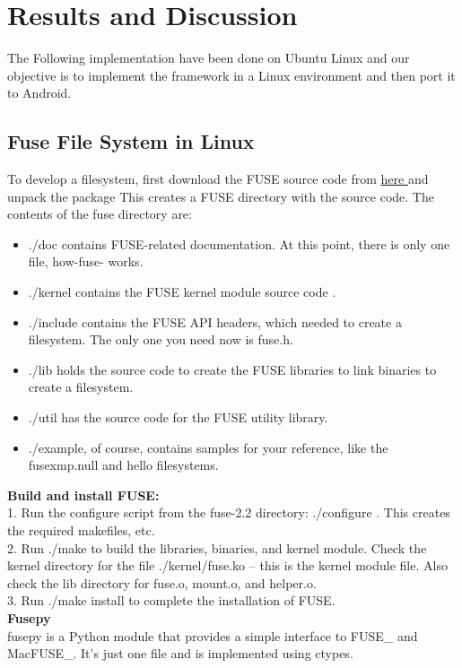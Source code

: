 \chapter{Results and Discussion}
\label{chap:results}
The Following implementation have been done on Ubuntu Linux and our objective is to implement the framework in a Linux environment and then port it to Android.

\section{Fuse File System in Linux}

To develop a filesystem, first download the FUSE source code from \href{https://github.com/libfuse/libfuse/releases }{here }  and unpack the package This creates a FUSE directory with the source code. The
contents of the fuse directory are:
\begin{itemize}
\item ./doc contains FUSE-related documentation. At this point, there is only one file, how-fuse-
works.
\item  ./kernel contains the FUSE kernel module source code .
\item  ./include contains the FUSE API headers, which  needed to create a filesystem. The only
one you need now is fuse.h.
 \item ./lib holds the source code to create the FUSE libraries to link binaries to create a filesystem.
\item ./util has the source code for the FUSE utility library.
 \item ./example, of course, contains samples for your reference, like the fusexmp.null and hello
filesystems.\\
\end{itemize}
\textbf{Build and install FUSE:}\\
1. Run the configure script from the fuse-2.2 directory: ./configure . This creates the required
makefiles, etc.\\
2. Run ./make to build the libraries, binaries, and kernel module. Check the kernel directory for
the file ./kernel/fuse.ko -- this is the kernel module file. Also check the lib directory for fuse.o,
mount.o, and helper.o.\\
3. Run ./make install to complete the installation of FUSE.\\

\textbf{Fusepy}\\
fusepy is a Python module that provides a simple interface to FUSE\_ and
MacFUSE\_. It's just one file and is implemented using ctypes.
